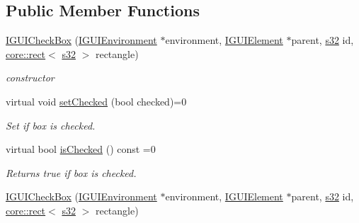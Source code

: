 \subsection*{Public Member Functions}
\begin{DoxyCompactItemize}
\item 
\mbox{\label{classirr_1_1gui_1_1IGUICheckBox_a6a9826188131ec1bf1d1ec22c3ce3393}} 
\hyperlink{classirr_1_1gui_1_1IGUICheckBox_a6a9826188131ec1bf1d1ec22c3ce3393}{I\+G\+U\+I\+Check\+Box} (\hyperlink{classirr_1_1gui_1_1IGUIEnvironment}{I\+G\+U\+I\+Environment} $\ast$environment, \hyperlink{classirr_1_1gui_1_1IGUIElement}{I\+G\+U\+I\+Element} $\ast$parent, \hyperlink{namespaceirr_ac66849b7a6ed16e30ebede579f9b47c6}{s32} id, \hyperlink{classirr_1_1core_1_1rect}{core\+::rect}$<$ \hyperlink{namespaceirr_ac66849b7a6ed16e30ebede579f9b47c6}{s32} $>$ rectangle)
\begin{DoxyCompactList}\small\item\em constructor \end{DoxyCompactList}\item 
\mbox{\label{classirr_1_1gui_1_1IGUICheckBox_ac57493d2d2ffbe820b0d634bd344d455}} 
virtual void \hyperlink{classirr_1_1gui_1_1IGUICheckBox_ac57493d2d2ffbe820b0d634bd344d455}{set\+Checked} (bool checked)=0
\begin{DoxyCompactList}\small\item\em Set if box is checked. \end{DoxyCompactList}\item 
\mbox{\label{classirr_1_1gui_1_1IGUICheckBox_a3c7bffd5a06af81ff894d08bdeaf72ca}} 
virtual bool \hyperlink{classirr_1_1gui_1_1IGUICheckBox_a3c7bffd5a06af81ff894d08bdeaf72ca}{is\+Checked} () const =0
\begin{DoxyCompactList}\small\item\em Returns true if box is checked. \end{DoxyCompactList}\item 
\mbox{\label{classirr_1_1gui_1_1IGUICheckBox_a6a9826188131ec1bf1d1ec22c3ce3393}} 
\hyperlink{classirr_1_1gui_1_1IGUICheckBox_a6a9826188131ec1bf1d1ec22c3ce3393}{I\+G\+U\+I\+Check\+Box} (\hyperlink{classirr_1_1gui_1_1IGUIEnvironment}{I\+G\+U\+I\+Environment} $\ast$environment, \hyperlink{classirr_1_1gui_1_1IGUIElement}{I\+G\+U\+I\+Element} $\ast$parent, \hyperlink{namespaceirr_ac66849b7a6ed16e30ebede579f9b47c6}{s32} id, \hyperlink{classirr_1_1core_1_1rect}{core\+::rect}$<$ \hyperlink{namespaceirr_ac66849b7a6ed16e30ebede579f9b47c6}{s32} $>$ rectangle)

\end{DoxyCompactItemize}
